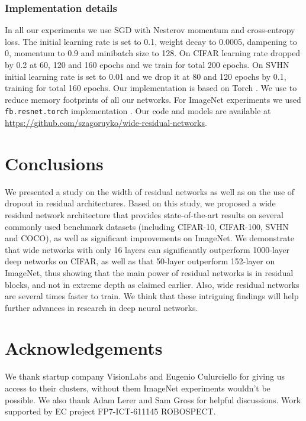\documentclass{bmvc2k}
\begin{document}
\subsubsection*{Implementation details} In all our experiments we use SGD with Nesterov momentum and cross-entropy loss. The initial learning rate is set to 0.1, weight decay to 0.0005, dampening to 0, momentum to 0.9 and minibatch size to 128. On CIFAR learning rate dropped by 0.2 at 60, 120 and 160 epochs and we train for total 200 epochs. On SVHN initial learning rate is set to 0.01 and we drop it at 80 and 120 epochs by 0.1, training for total 160 epochs. Our implementation is based on Torch \cite{torch}. We use \cite{optimize-net} to reduce memory footprints of all our networks. For ImageNet experiments we used \texttt{fb.resnet.torch} implementation \cite{fb.resnet.torch}. Our code and models are available at \url{https://github.com/szagoruyko/wide-residual-networks}.

\section{Conclusions}

We presented a study on the width of residual networks as well as   on the use of dropout in residual architectures. Based on this study, we  proposed a   wide residual network architecture that provides state-of-the-art results on several commonly used benchmark datasets (including CIFAR-10, CIFAR-100, SVHN and COCO), as well as significant improvements on ImageNet. We demonstrate that wide networks with only 16 layers can significantly outperform 1000-layer deep networks on CIFAR, as well as that 50-layer outperform 152-layer on ImageNet, thus showing that the main power of residual networks is in residual blocks, and not in extreme depth as claimed earlier. Also, wide residual networks are several times faster to train. We think that these intriguing findings will help further advances in research in deep neural networks.

\section{Acknowledgements}

We thank startup company VisionLabs and Eugenio Culurciello for giving us access to their clusters, without them ImageNet experiments wouldn't be possible. We also thank Adam Lerer and Sam Gross for helpful discussions. Work supported by EC project FP7-ICT-611145 ROBOSPECT.


\end{document}
